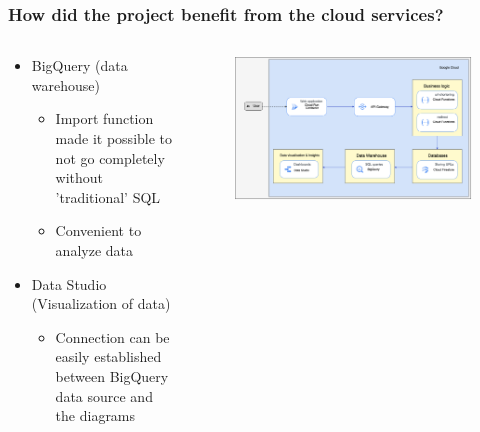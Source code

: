\documentclass[aspectratio=169,16pt]{beamer}
\begin{document}
\begin{frame}
    \frametitle{How did the project benefit from the cloud services?}

    \begin{columns}[onlytextwidth]
        \begin{column}{0.5\textwidth}
            \begin{itemize}
                \item BigQuery (data warehouse)
                      \begin{itemize}
                          \item Import function made it possible to not go completely without
                                'traditional' SQL
                          \item Convenient to analyze data
                      \end{itemize}
                \item Data Studio (Visualization of data)
                      \begin{itemize}
                          \item Connection can be easily established between BigQuery data source
                                and the diagrams
                      \end{itemize}
            \end{itemize}
        \end{column}

        \begin{column}{0.5\textwidth}

            \begin{center}
                \begin{figure}
                    \centering\includegraphics[height=.5\paperheight]{architecture}
                \end{figure}
            \end{center}

        \end{column}
    \end{columns}
\end{frame}
\end{document}
